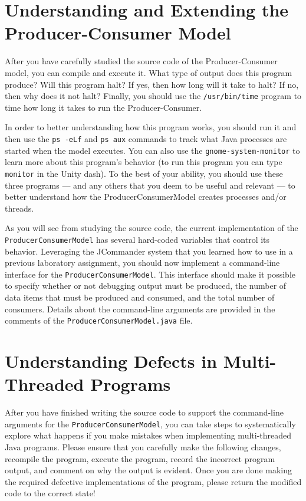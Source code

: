 \section*{Understanding and Extending the Producer-Consumer Model}

After you have carefully studied the source code of the Producer-Consumer model, you can compile and execute it.  What type of
output does this program produce?  Will this program halt?  If yes, then how long will it take to halt?  If no, then why does it
not halt? Finally, you should use the {\tt /usr/bin/time} program to time how long it takes to run the Producer-Consumer.

In order to better understanding how this program works, you should run it and then use the {\tt ps -eLf} and {\tt ps aux}
commands to track what Java processes are started when the model executes. You can also use the {\tt gnome-system-monitor} to
learn more about this program's behavior (to run this program you can type {\tt monitor} in the Unity dash).  To the best of your
ability, you should use these three programs --- and any others that you deem to be useful and relevant --- to better understand
how the ProducerConsumerModel creates processes and/or threads.

\begin{sloppypar}
  As you will see from studying the source code, the current implementation of the {\tt ProducerConsumerModel} has several
  hard-coded variables that control its behavior. Leveraging the JCommander system that you learned how to use in a previous
  laboratory assignment, you should now implement a command-line interface for the {\tt ProducerConsumerModel}.  This interface
  should make it possible to specify whether or not debugging output must be produced, the number of data items that must be
  produced and consumed, and the total number of consumers.  Details about the command-line arguments are provided in the comments
  of the {\tt ProducerConsumerModel.java} file. 
\end{sloppypar}

\section*{Understanding Defects in Multi-Threaded Programs}

  After you have finished writing the source code to support the command-line arguments for the {\tt ProducerConsumerModel}, you
  can take steps to systematically explore what happens if you make mistakes when implementing multi-threaded Java programs.
  Please ensure that you carefully make the following changes, recompile the program, execute the program, record the incorrect
  program output, and comment on why the output is evident.  Once you are done making the required defective implementations of
  the program, please return the modified code to the correct state!

